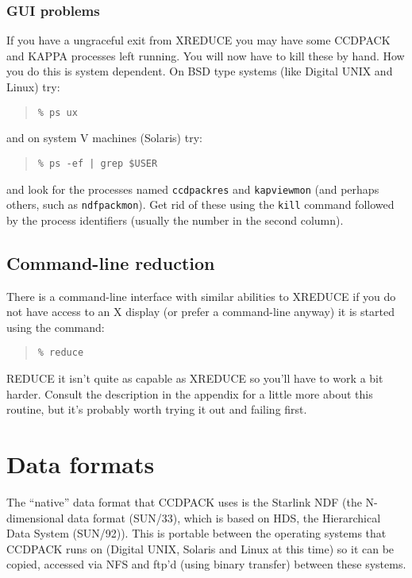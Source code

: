 \documentclass[twoside,11pt]{article}
\newcommand{\htmlref}[2]{#1}
\newcommand{\xref}[3]{#1}
\newcommand{\xlabel}[1]{}
\renewcommand{\_}{\texttt{\symbol{95}}}
\newenvironment{myquote}{\begin{quote}\begin{small}}{\end{small}\end{quote}}
\newcommand{\text}[1]{{\small \tt #1}}
\newcommand{\routine}[1]{{\sc #1}}
\newcommand{\xroutine}[1]{\htmlref{{\sc #1}}{#1}}
\begin{document}
\subsubsection{GUI problems}
If you have a ungraceful exit from \xroutine{XREDUCE} you may have
some CCDPACK and \xref{KAPPA}{sun95}{} processes left running.  You
will now have to kill these by hand.  How you do this is system
dependent.  On BSD type systems (like Digital UNIX and Linux) try:
\begin{myquote}
\begin{verbatim}
% ps ux
\end{verbatim}
\end{myquote}
and on system V machines (Solaris) try:
\begin{myquote}
\begin{verbatim}
% ps -ef | grep $USER
\end{verbatim}
\end{myquote}
and look for the processes named \text{ccdpack\_res} and
\text{kapview\_mon} (and perhaps others, such as
\text{ndfpack\_mon}).
Get rid of these using the \text{kill} command followed by the
process identifiers (usually the number in the second column).

\subsection{Command-line reduction}
There is a command-line interface with similar abilities to
\xroutine{XREDUCE} if you do not have access to an X display (or prefer
a command-line anyway) it is started using the command:
\begin{myquote}
\begin{verbatim}
% reduce
\end{verbatim}
\end{myquote}
\xroutine{REDUCE} it isn't quite as capable as \routine{XREDUCE} so
you'll have to work a bit harder.  Consult the description in the
appendix for a little more about this routine, but it's probably
worth trying it out and failing first.

\section{Data\label{datatypes} \xlabel{datatypes} formats}
The ``native'' data format that CCDPACK uses is the Starlink NDF (the
N-dimensional data format (\xref{SUN/33}{sun33}{}), which is based on
HDS, the Hierarchical Data System \xref{(SUN/92)}{sun92}{}).  This is
portable between the operating systems that CCDPACK runs on (Digital
UNIX, Solaris and Linux at this time) so it can be copied, accessed
via NFS and ftp'd (using binary transfer) between these systems.
\end{document}
